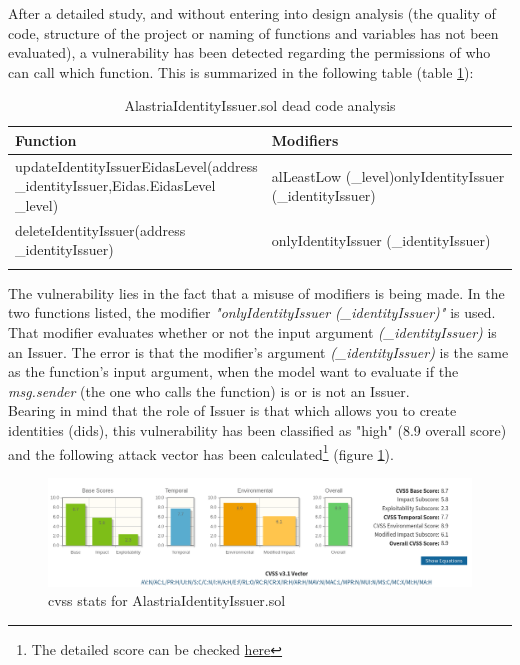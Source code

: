 \documentclass[a4paper, 12pt]{article} %
\begin{document}
            After a detailed study, and without entering into design analysis (the quality of code, structure of the project or naming of functions and variables has not been evaluated), a vulnerability has been detected regarding the permissions of who can call which function. This is summarized in the following table (table \ref{tab:dead-code-issuer}):
            \begin{longtable}{||p{0.5\linewidth} | p{0.5\linewidth}||}
                \hline
                \textbf{Function}  & \textbf{Modifiers}\\ [0.5ex] 
                \hline\hline
                updateIdentityIssuerEidasLevel\newline (address \_identityIssuer,\newline Eidas.EidasLevel \_level) & alLeastLow (\_level)\newline onlyIdentityIssuer (\_identityIssuer)\\ 
                \hline
                deleteIdentityIssuer\newline (address \_identityIssuer) & onlyIdentityIssuer (\_identityIssuer)\\[1ex] 
                \hline
                \caption{AlastriaIdentityIssuer.sol dead code analysis}
                \label{tab:dead-code-issuer}
            \end{longtable}
            The vulnerability lies in the fact that a misuse of modifiers is being made.  In the two functions listed, the modifier \textit{"onlyIdentityIssuer (\_identityIssuer)"} is used. That modifier evaluates whether or not the input argument \textit{(\_identityIssuer)} is an Issuer. The error is that the modifier's argument \textit{(\_identityIssuer)} is the same as the function's input argument, when the model want to evaluate if the \textit{msg.sender} (the one who calls the function) is or is not an Issuer.\\
            
            Bearing in mind that the role of Issuer is that which allows you to create identities (\acrshort{did}s), this vulnerability has been classified as "high" (8.9 overall score) and the following attack vector has been calculated\footnote{The detailed score can be checked \href{https://nvd.nist.gov/vuln-metrics/cvss/v3-calculator?vector=AV:N/AC:L/PR:H/UI:N/S:C/C:N/I:H/A:H/E:F/RL:O/RC:R/CR:X/IR:H/AR:H/MAV:N/MAC:L/MPR:N/MUI:N/MS:C/MC:X/MI:H/MA:H&version=3.1}{here}} (figure \ref{fig:stats-aii}).\\
            \begin{figure}[h]
                \centering
                \includegraphics[width=1.1\textwidth]{stats-aii.png}
                \caption{\acrshort{cvss} stats for AlastriaIdentityIssuer.sol}
                \label{fig:stats-aii}
            \end{figure}
            
\end{document}
